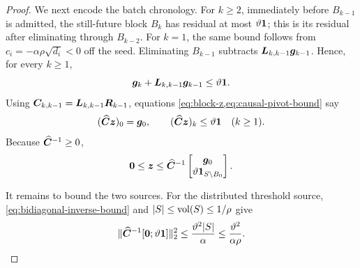 \begin{proof}
We next encode the batch chronology.  For $k\geq2$, immediately before
$B_{k-1}$ is admitted, the still-future block $B_k$ has residual at most
$\vartheta\mathbf{1}$; this is its residual after eliminating through $B_{k-2}$.
For $k=1$, the same bound follows from
$c_i=-\alpha\rho\sqrt{d_i}<0$ off the seed.  Eliminating $B_{k-1}$ subtracts
$\bm{L}_{k,k-1}\bm{g}_{k-1}$.  Hence, for every $k\geq1$,
\begin{equation}
 \bm{g}_k+\bm{L}_{k,k-1}\bm{g}_{k-1}\leq\vartheta\mathbf{1}.
 \label{eq:causal-pivot-bound}
\end{equation}
Using $\bm{C}_{k,k-1}=\bm{L}_{k,k-1}\bm{R}_{k-1}$, equations
\cref{eq:block-z,eq:causal-pivot-bound} say
\begin{equation}
 (\widehat{\bm{C}}\bm{z})_0=\bm{g}_0,
 \qquad
 (\widehat{\bm{C}}\bm{z})_k\leq\vartheta\mathbf{1}\quad(k\geq1).
 \label{eq:chain-forcing}
\end{equation}
Because $\widehat{\bm{C}}^{-1}\geq0$,
\begin{equation}
 \bm{0}\leq\bm{z}
 \leq\widehat{\bm{C}}^{-1}
 \begin{bmatrix}\bm{g}_0\\ \vartheta\mathbf{1}_{S\setminus B_0}\end{bmatrix}.
 \label{eq:chain-domination}
\end{equation}

It remains to bound the two sources.  For the distributed threshold source,
\cref{eq:bidiagonal-inverse-bound} and $|S|\leq\operatorname{vol}(S)\leq1/\rho$ give
\begin{equation}
 \lVert\widehat{\bm{C}}^{-1}
 [\bm{0};\vartheta\mathbf{1}]\rVert_2^2
 \leq\frac{\vartheta^2|S|}{\alpha}
 \leq\frac{\vartheta^2}{\alpha\rho}.
 \label{eq:threshold-forcing-bound}
\end{equation}


\end{proof}
